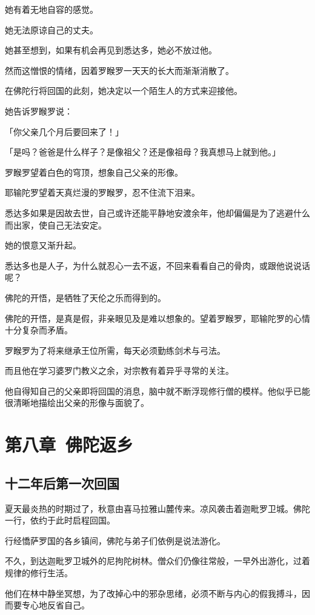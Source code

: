 \documentclass[twoside,openany]{book}
\begin{document}
她有着无地自容的感觉。

她无法原谅自己的丈夫。

她甚至想到，如果有机会再见到悉达多，她必不放过他。

然而这憎恨的情绪，因着罗睺罗一天天的长大而渐渐消散了。

在佛陀行将回国的此刻，她决定以一个陌生人的方式来迎接他。

她告诉罗睺罗说：

「你父亲几个月后要回来了！」

「是吗？爸爸是什么样子？是像祖父？还是像祖母？我真想马上就到他。」

罗睺罗望着白色的穹顶，想象自己父亲的形像。

耶输陀罗望着天真烂漫的罗睺罗，忍不住流下泪来。

悉达多如果是因故去世，自己或许还能平静地安渡余年，他却偏偏是为了逃避什么而出家，使自己无法安定。

她的恨意又渐升起。

悉达多也是人子，为什么就忍心一去不返，不回来看看自己的骨肉，或跟他说说话呢？

佛陀的开悟，是牺牲了天伦之乐而得到的。

佛陀的开悟，是真是假，非亲眼见及是难以想象的。望着罗睺罗，耶输陀罗的心情十分复杂而矛盾。

罗睺罗为了将来继承王位所需，每天必须勤练剑术与弓法。

而且他在学习婆罗门教义之余，对宗教有着异乎寻常的关注。

他自得知自己的父亲即将回国的消息，脑中就不断浮现修行僧的模样。他似乎已能很清晰地描绘出父亲的形像与面貌了。



\chapter{第八章\ 佛陀返乡}\label{ch8}

\section{十二年后第一次回国}\label{sec8.1}

夏天最炎热的时期过了，秋意由喜马拉雅山麓传来。凉风袭击着迦毗罗卫城。佛陀一行，依约于此时启程回国。

行经憍萨罗国的各乡镇间，佛陀与弟子们依例是说法游化。

不久，到达迦毗罗卫城外的尼拘陀树林。僧众们仍像往常般，一早外出游化，过着规律的修行生活。

他们在林中静坐冥想，为了改掉心中的邪杂思绪，必须不断与内心的假我搏斗，因而要专心地反省自己。
\end{document}
